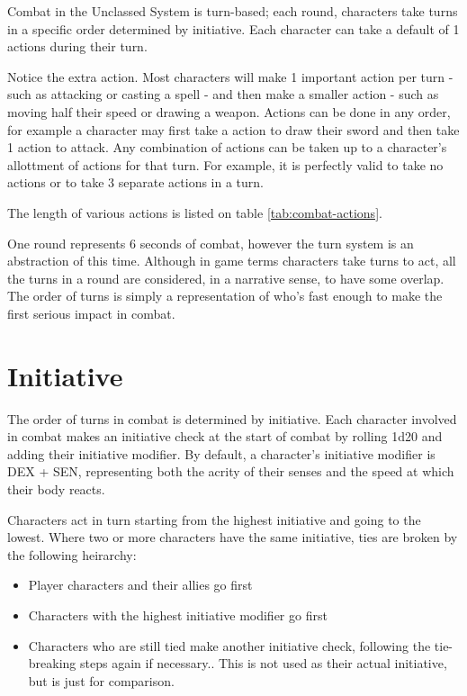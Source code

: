 \begin{multicols*}{2}
    Combat in the Unclassed System is turn-based; each round, characters take
    turns in a specific order determined by initiative. Each character can
    take a default of 1 \textonehalf actions during their turn.

    Notice the extra \textonehalf action. Most characters will make 1 important
    action per turn - such as attacking or casting a spell - and then make a
    smaller \textonehalf action - such as moving half their speed or drawing a
    weapon. Actions can be done in any order, for example a character may first
    take a \textonehalf action to draw their sword and then take 1 action to
    attack. Any combination of actions can be taken up to a character's
    allottment of actions for that turn. For example, it is perfectly valid
    to take no actions or to take 3 separate \textonehalf actions in a turn.

    The length of various actions is listed on table \ref{tab:combat-actions}.

    One round represents 6 seconds of combat, however the turn system is an
    abstraction of this time. Although in game terms characters take turns to
    act, all the turns in a round are considered, in a narrative sense, to have
    some overlap. The order of turns is simply a representation of who's fast
    enough to make the first serious impact in combat.

    \section{Initiative}
    The order of turns in combat is determined by initiative. Each character
    involved in combat makes an initiative check at the start of combat by
    rolling 1d20 and adding their initiative modifier. By default, a
    character's initiative modifier is DEX + SEN, representing both the acrity
    of their senses and the speed at which their body reacts.

    Characters act in turn starting from the highest initiative and going to
    the lowest. Where two or more characters have the same initiative, ties
    are broken by the following heirarchy:
    \begin{itemize}
        \item Player characters and their allies go first
        \item Characters with the highest initiative modifier go first
        \item Characters who are still tied make another initiative check,
            following the tie-breaking steps again if necessary..
            This is not used as their actual initiative, but is just for
            comparison.
    \end{itemize}


\end{multicols*}
